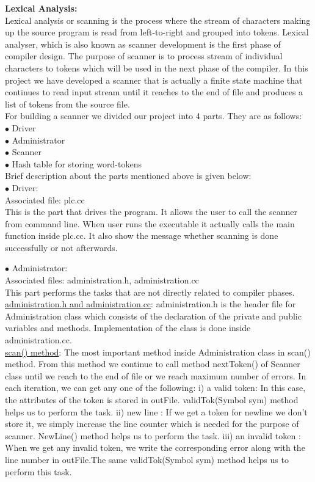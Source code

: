 \documentclass[paper=letter, fontsize=12pt]{scrartcl} %
\begin{document}
\pagebreak

{\bf {\huge Lexical Analysis:}}\\
Lexical analysis or scanning is the process where the stream of characters making up the source program is read from left-to-right and grouped into tokens. Lexical analyser, which is also known as scanner development is the first phase of compiler design. The purpose of scanner is to process stream of individual characters to tokens which will be used in the next phase of the compiler. In this project we have developed a scanner that is actually a finite state machine that continues to read input stream until it reaches to the end of file and produces a list of tokens from the source file.\\
For building a scanner we divided our project into 4 parts. They are as follows:\\
$\bullet$ Driver\\
$\bullet$ Administrator\\
$\bullet$ Scanner\\
$\bullet$ Hash table for storing word-tokens\\

Brief description about the parts mentioned above is given below:\\
$\bullet$ Driver:\\

Associated file: plc.cc\\
This is the part that drives the program. It allows the user to call the scanner from command line. When user runs the executable it actually calls the main function inside plc.cc. It also show the message whether scanning is done successfully or not afterwards.

$\bullet$ Administrator:\\

Associated files: administration.h, administration.cc\\
This part performs the tasks that are not directly related to compiler phases.\\

\underline {administration.h and administration.cc}: administration.h is the header file for Administration class which consists of the declaration of the private and public variables and methods. Implementation of the class is done inside administration.cc.\\

\underline {scan() method}:  The most important method inside Administration class in scan() method. From this method we continue to call method nextToken() of Scanner class until we reach to the end of file or we reach maximum number of errors. In each iteration, we can get any one of the following:
	i)   a valid token: In this case, the attributes of the token is stored in outFile. validTok(Symbol sym) method helps us to perform the task.
	ii)  new line : If we get a token for newline we don't store it, we simply increase the line counter which is needed for the purpose of scanner. NewLine() method helps us to perform the task.
	iii) an invalid token : When we get any invalid token, we write the corresponding error along with the line number in outFile.The same validTok(Symbol sym) method helps us to perform this task.
\end{document}
